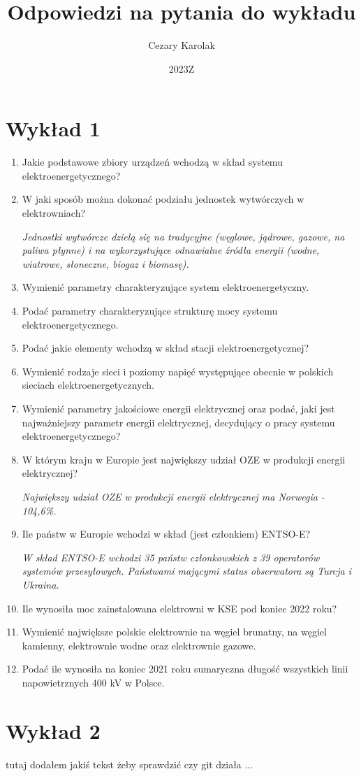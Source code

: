 \documentclass[12pt]{article}
\title{Odpowiedzi na pytania do wykładu}
\author{Cezary Karolak}
\date{2023Z}
\begin{document}
\maketitle
\tableofcontents
\newpage

\section{Wykład 1}

\begin{enumerate}
    \item{Jakie podstawowe zbiory urządzeń wchodzą w skład systemu elektroenergetycznego?}
    
    \item{W jaki sposób można dokonać podziału jednostek wytwórczych w elektrowniach?}
    
        \textit{Jednostki wytwórcze dzielą się na tradycyjne (węglowe, jądrowe, gazowe, na paliwa płynne) i na wykorzystujące odnawialne źródła energii (wodne, wiatrowe, słoneczne, biogaz i biomasę).}
    
    \item Wymienić parametry charakteryzujące system elektroenergetyczny.

    \item Podać parametry charakteryzujące strukturę mocy systemu elektroenergetycznego.
    \item Podać jakie elementy wchodzą w skład stacji elektroenergetycznej?
    \item Wymienić rodzaje sieci i poziomy napięć występujące obecnie w polskich sieciach elektroenergetycznych.
    \item Wymienić parametry jakościowe energii elektrycznej oraz podać, jaki jest najważniejszy parametr energii elektrycznej, decydujący o pracy systemu elektroenergetycznego?
    \item W którym kraju w Europie jest największy udział OZE w produkcji energii elektrycznej?

        \textit{Największy udział OZE w produkcji energii elektrycznej ma Norwegia - 104,6\%.}
        
    \item Ile państw w Europie wchodzi w skład (jest członkiem) ENTSO-E?

        \textit{W skład ENTSO-E wchodzi 35 państw członkowskich z 39 operatorów systemów przesyłowych. Państwami mającymi status obserwatora są Turcja i Ukraina.}
        
    \item Ile wynosiła moc zainstalowana elektrowni w KSE pod koniec 2022 roku?
    \item Wymienić największe polskie elektrownie na węgiel brunatny, na węgiel kamienny, elektrownie wodne oraz elektrownie gazowe.
    \item Podać ile wynosiła na koniec 2021 roku sumaryczna długość wszystkich linii napowietrznych 400 kV w Polsce.
\end{enumerate}

\section{Wykład 2}

tutaj dodałem jakiś tekst żeby sprawdzić czy git działa ...
\end{document}
